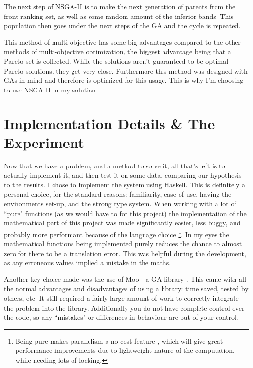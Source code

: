 \documentclass[11pt]{article}
\begin{document}
    The next step of NSGA-II is to make the next generation of parents from the front ranking
    set, as well as some random amount of the inferior bands. This population
    then goes under the next steps of the GA and the cycle is repeated.

    This method of multi-objective has some big advantages compared to the other methods of multi-objective optimization,
    the biggest advantage being that a Pareto set is collected. While the solutions aren't guaranteed to be optimal Pareto solutions, they
    get very close. Furthermore this method was designed with GAs in mind and therefore is
    optimized for this usage. This is why I'm choosing to use NSGA-II in my solution.

\section{Implementation Details \& The Experiment}

    Now that we have a problem, and a method to solve it, all that's left is to actually
    implement it, and then test it on some data, comparing our hypothesis to the results.
    I chose to implement the system using Haskell. This is definitely a personal
    choice, for the standard reasons: familiarity, ease of use, having the environments
    set-up, and the strong type system. When working with a lot of ``pure"
    functions (as we would have to for this project) the implementation 
    of the mathematical part of this project was made significantly
    easier, less buggy, and probably more performant because of the language choice
    \footnote{Being pure makes parallelism a no cost feature \cite{HarrisMarlowJones, Chakravarty},
    which will give great performance improvements due to lightweight nature of the 
    computation, while needing lots of locking. }.
    In my eyes the mathematical functions
    being implemented purely reduces the chance to almost zero for there to be a translation
    error. This was helpful during the development, as any erroneous values implied a mistake
    in the maths.

    Another key choice made was the use of Moo - a GA library \cite{Moo}. This came with all
    the normal advantages and disadvantages of using a library: time saved, tested by others, etc.
    It still required a fairly large amount of work to correctly integrate the
    problem into the library. Additionally you do not have complete control over the code,
    so any ``mistakes" or differences in behaviour are out of your control.
\end{document}
